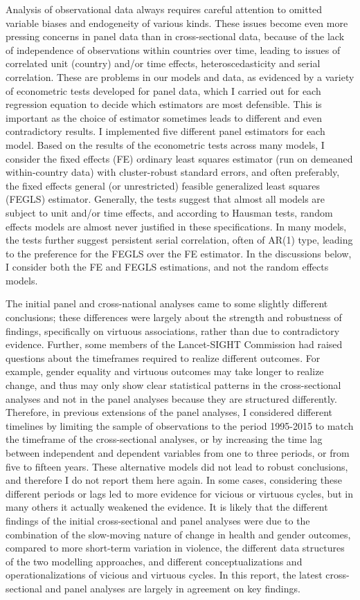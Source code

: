 \documentclass[12pt]{article}
\begin{document}
Analysis of observational data always requires careful attention to omitted variable biases and endogeneity of various kinds.
These issues become even more pressing concerns in panel data than in cross-sectional data, because of the lack of independence of observations within countries over time, leading to issues of correlated unit (country) and/or time effects, heteroscedasticity and serial correlation.
These are problems in our models and data, as evidenced by a variety of econometric tests developed for panel data, which I carried out for each regression equation to decide which estimators are most defensible.
This is important as the choice of estimator sometimes leads to different and even contradictory results.
I implemented five different panel estimators for each model.
Based on the results of the econometric tests across many models, I consider the fixed effects (FE) ordinary least squares estimator (run on demeaned within-country data) with cluster-robust standard errors, and often preferably, the fixed effects general (or unrestricted) feasible generalized least squares (FEGLS) estimator.
Generally, the tests suggest that almost all models are subject to unit and/or time effects, and according to Hausman tests, random effects models are almost never justified in these specifications. In many models, the tests further suggest persistent serial correlation, often of AR(1) type, leading to the preference for the FEGLS over the FE estimator.
In the discussions below, I consider both the FE and FEGLS estimations, and not the random effects models.

The initial panel and cross-national analyses came to some slightly different conclusions; these differences were largely about the strength and robustness of findings, specifically on virtuous associations, rather than due to contradictory evidence.
Further, some members of the Lancet-SIGHT Commission had raised questions about the timeframes required to realize different outcomes. For example, gender equality and virtuous outcomes may take longer to realize change, and thus may only show clear statistical patterns in the cross-sectional analyses and not in the panel analyses because they are structured differently.
Therefore, in previous extensions of the panel analyses, I considered different timelines by limiting the sample of observations to the period 1995-2015 to match the timeframe of the cross-sectional analyses, or by increasing the time lag between independent and dependent variables from one to three periods, or from five to fifteen years.
These alternative models did not lead to robust conclusions, and therefore I do not report them here again.
In some cases, considering these different periods or lags led to more evidence for vicious or virtuous cycles, but in many others it actually weakened the evidence.
It is likely that the different findings of the initial cross-sectional and panel analyses were due to the combination of the slow-moving nature of change in health and gender outcomes, compared to more short-term variation in violence, the different data structures of the two modelling approaches, and different conceptualizations and operationalizations of vicious and virtuous cycles.
In this report, the latest cross-sectional and panel analyses are largely in agreement on key findings.
\end{document}
